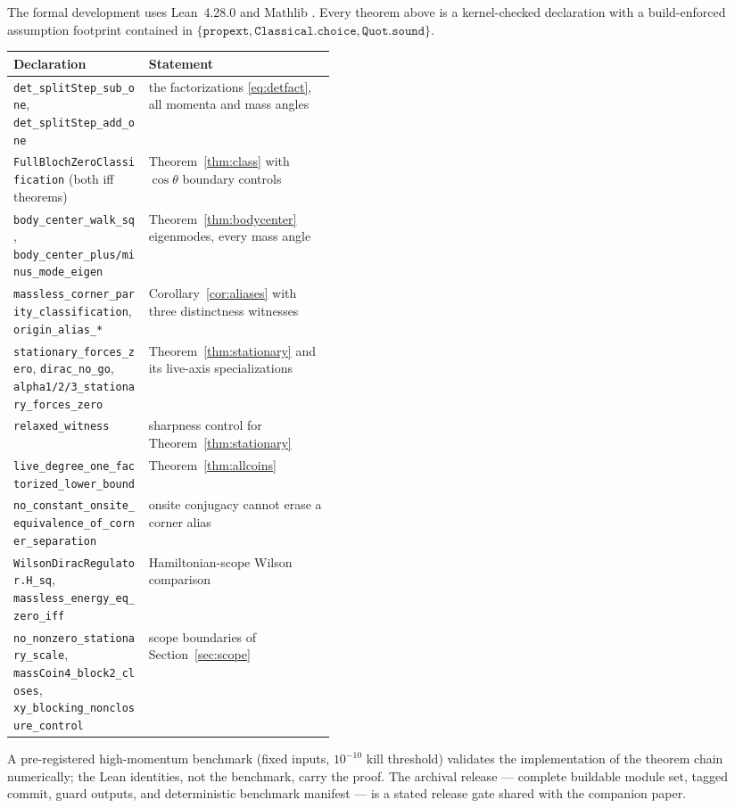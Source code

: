 \documentclass[11pt]{article}
\begin{document}
The formal development uses Lean~4.28.0 and Mathlib \cite{Lean4,Mathlib}.
Every theorem above is a kernel-checked declaration with a build-enforced
assumption footprint contained in
$\{\mathtt{propext},\mathtt{Classical.choice},\mathtt{Quot.sound}\}$.

\begin{center}
\small
\begin{tabularx}{\linewidth}{@{}p{0.42\linewidth}X@{}}
\toprule
Declaration & Statement\\
\midrule
\texttt{det\_splitStep\_sub\_one}, \texttt{det\_splitStep\_add\_one}
 & the factorizations \eqref{eq:detfact}, all momenta and mass angles\\
\texttt{FullBlochZeroClassification} (both iff theorems)
 & Theorem~\ref{thm:class} with $\cos\theta$ boundary controls\\
\texttt{body\_center\_walk\_sq},
\texttt{body\_center\_plus/minus\_mode\_eigen}
 & Theorem~\ref{thm:bodycenter} eigenmodes, every mass angle\\
\texttt{massless\_corner\_parity\_classification},
\texttt{origin\_alias\_*}
 & Corollary~\ref{cor:aliases} with three distinctness witnesses\\
\texttt{stationary\_forces\_zero}, \texttt{dirac\_no\_go},
\texttt{alpha1/2/3\_stationary\_forces\_zero}
 & Theorem~\ref{thm:stationary} and its live-axis specializations\\
\texttt{relaxed\_witness}
 & sharpness control for Theorem~\ref{thm:stationary}\\
\texttt{live\_degree\_one\_factorized\_lower\_bound}
 & Theorem~\ref{thm:allcoins}\\
\texttt{no\_constant\_onsite\_equivalence\_of\_corner\_separation}
 & onsite conjugacy cannot erase a corner alias\\
\texttt{WilsonDiracRegulator.H\_sq},
\texttt{massless\_energy\_eq\_zero\_iff}
 & Hamiltonian-scope Wilson comparison\\
\texttt{no\_nonzero\_stationary\_scale},
\texttt{massCoin4\_block2\_closes},
\texttt{xy\_blocking\_nonclosure\_control}
 & scope boundaries of Section~\ref{sec:scope}\\
\bottomrule
\end{tabularx}
\end{center}

A pre-registered high-momentum benchmark (fixed inputs, $10^{-10}$ kill
threshold) validates the implementation of the theorem chain numerically;
the Lean identities, not the benchmark, carry the proof.  The archival
release --- complete buildable module set, tagged commit, guard outputs,
and deterministic benchmark manifest --- is a stated release gate shared
with the companion paper.
\end{document}
